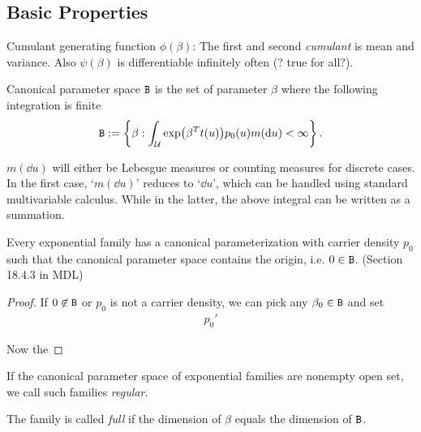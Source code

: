 
\subsection{Basic Properties}

Cumulant generating function $\phi(\beta)$: The first and second \emph{cumulant} is mean and variance.
Also $\psi(\beta)$ is differentiable infinitely often (? true for all?).

\begin{define}
	Canonical parameter space $\mathtt{B}$ is the set of parameter $\beta$
	where the following integration is finite
	\begin{align*}
		\Bt := \left\{\beta: \int_{\Uc} \exp(\beta^T t(u)) p_0(u)m(\dd{u}) <\infty \right\}.
	\end{align*}

	$m(\dd{u})$ will either be Lebesgue measures or counting measures for discrete cases.
	In the first case, `$m(\dd{u})$' reduces to `$\dd{u}$',
	which can be handled using standard multivariable calculus.
	While in the latter, the above integral can be
	written as a summation.
\end{define}

\begin{remark}
	Every exponential family has a canonical parameterization with carrier density $p_0$
	such that the canonical parameter space contains the origin, i.e. $0 \in \mathtt{B}$.
	(Section 18.4.3 in MDL)
\end{remark}

\begin{proof}
	If $0 \not\in \mathtt{B}$ or $p_0$ is not a carrier density, we can pick any $\beta_0 \in \mathtt{B}$
	and set
	\begin{align*}
		p_0'
	\end{align*}

	Now the
\end{proof}

\begin{define}
	If the canonical parameter space of exponential families are nonempty open set,
	we call such families \emph{regular}.
\end{define}

\begin{define}
	The family is called \emph{full} if the dimension of $\beta$ equals the dimension of $\mathtt{B}$.
\end{define}

